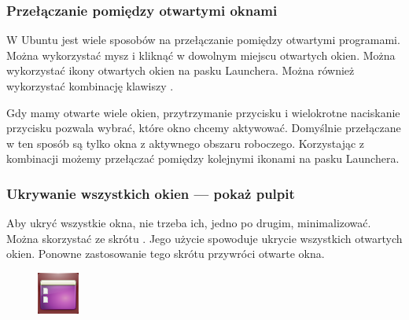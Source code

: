\subsubsection{Przełączanie pomiędzy otwartymi oknami}
W Ubuntu jest wiele sposobów na przełączanie pomiędzy otwartymi programami. Można wykorzystać mysz i kliknąć w dowolnym miejscu otwartych okien. Można wykorzystać ikony otwartych okien na pasku Launchera. Można również wykorzystać kombinację klawiszy .

Gdy mamy otwarte wiele okien, przytrzymanie przycisku  i wielokrotne naciskanie przycisku  pozwala wybrać, które okno chcemy aktywować. Domyślnie przełączane w ten sposób są tylko okna z aktywnego obszaru roboczego. Korzystając z kombinacji  możemy przełączać pomiędzy kolejnymi ikonami na pasku Launchera.

\subsubsection{Ukrywanie wszystkich okien --- pokaż pulpit}
Aby ukryć wszystkie okna, nie trzeba ich, jedno po drugim, minimalizować. Można skorzystać ze skrótu . Jego użycie spowoduje ukrycie wszystkich otwartych okien. Ponowne zastosowanie tego skrótu przywróci otwarte okna.

\begin{figure}
	\vspace{-10pt}	
	\includegraphics[width=\linewidth]{images/ikony_pokaz_pulpit.png}
\end{figure}

